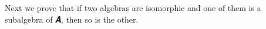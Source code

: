 \begin{code}
\>[0]\AgdaSpace{}%
\AgdaSymbol{:}\AgdaSpace{}%
\>[234I]\AgdaSymbol{(}\AgdaSpace{}%
\AgdaSymbol{:}\AgdaSpace{}%
\AgdaSpace{}%
\AgdaSpace{}%
\AgdaSymbol{)\{}\AgdaSpace{}%
\AgdaSymbol{:}\AgdaSpace{}%
\AgdaSpace{}%
\AgdaSpace{}%
\AgdaSymbol{\}\{}\AgdaSpace{}%
\AgdaSymbol{:}\AgdaSpace{}%
\AgdaSpace{}%
\AgdaSpace{}%
\AgdaSymbol{\}}\<%
\\
\>[0][@{}l@{\AgdaIndent{0}}]%
\>[1]%
%
\>[11]\AgdaSpace{}%
\AgdaSpace{}%
\AgdaSpace{}%
\AgdaSpace{}%
\AgdaSpace{}%
\AgdaSpace{}%
\AgdaSpace{}%
\AgdaSpace{}%
\AgdaSpace{}%
\AgdaSpace{}%
\<%
\\
%
\>[0]\AgdaSpace{}%
\AgdaSpace{}%
\AgdaSymbol{\{}\AgdaSymbol{\}\{}\AgdaSymbol{\}}\AgdaSpace{}%
\AgdaSymbol{=}\AgdaSpace{}%
\AgdaSpace{}%
\AgdaSpace{}%
\AgdaSpace{}%
\<%
\end{code}
\ccpad
Next we prove that if two algebras are isomorphic and one of them is a subalgebra of \ab 𝑨, then so is the other.
\ccpad
